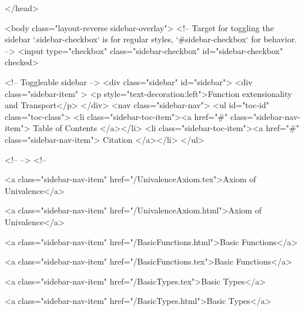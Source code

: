   
</head>




  <body class="layout-reverse sidebar-overlay">
    <!-- Target for toggling the sidebar `.sidebar-checkbox` is for regular
     styles, `#sidebar-checkbox` for behavior. -->
<input type="checkbox" class="sidebar-checkbox" id="sidebar-checkbox" checked>

<!-- Toggleable sidebar -->
<div class="sidebar" id="sidebar">
  <div class="sidebar-item" >
    <p style="text-decoration:left">Function extensionality and Transport</p>
  </div>
  <nav class="sidebar-nav">
    <ul id="toc-id" class="toc-class">
  <li class="sidebar-toc-item"><a href="#" class="sidebar-nav-item"> Table of Contents </a></li>
  <li class="sidebar-toc-item"><a href="#" class="sidebar-nav-item"> Citation </a></li>
</ul>


    <!--  -->
    <!-- 
      
    
      
    
      
    
      
    
      
        
      
    
      
        
          <a class="sidebar-nav-item" href="/UnivalenceAxiom.tex">Axiom of Univalence</a>
        
      
    
      
        
          <a class="sidebar-nav-item" href="/UnivalenceAxiom.html">Axiom of Univalence</a>
        
      
    
      
        
          <a class="sidebar-nav-item" href="/BasicFunctions.html">Basic Functions</a>
        
      
    
      
        
          <a class="sidebar-nav-item" href="/BasicFunctions.tex">Basic Functions</a>
        
      
    
      
        
          <a class="sidebar-nav-item" href="/BasicTypes.tex">Basic Types</a>
        
      
    
      
        
          <a class="sidebar-nav-item" href="/BasicTypes.html">Basic Types</a>
        
